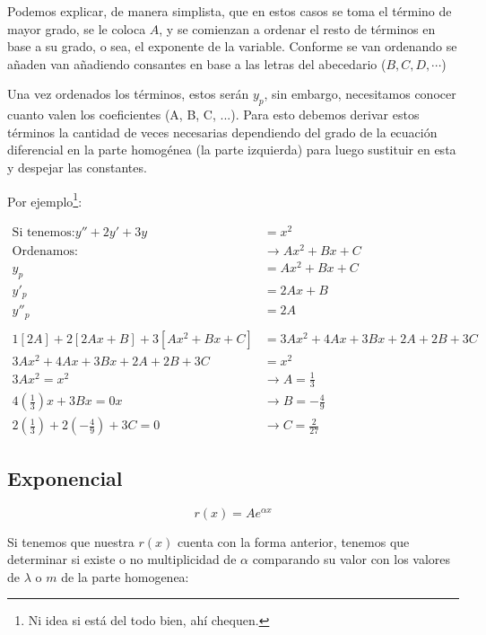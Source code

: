 Podemos explicar, de manera simplista, que en estos casos se toma el término de mayor grado, se le coloca $A$, y se comienzan a ordenar el resto de términos en base a su grado, o sea, el exponente de la variable. Conforme se van ordenando se añaden van añadiendo consantes en base a las letras del abecedario ($B,C,D, \cdots$)

Una vez ordenados los términos, estos serán $y_{p}$, sin embargo, necesitamos conocer cuanto valen los coeficientes (A, B, C, ...). Para esto debemos derivar estos términos la cantidad de veces necesarias dependiendo del grado de la ecuación diferencial en la parte homogénea (la parte izquierda) para luego sustituir en esta y despejar las constantes.

Por ejemplo\footnote{Ni idea si está del todo bien, ahí chequen.}:

\begin{align*}
    \text{Si tenemos:} y'' + 2y' + 3y &= x^{2}
    \\
    \text{Ordenamos:} &\longrightarrow Ax^{2} + Bx + C
    \\
    y_{p} &= Ax^{2} + Bx + C
    \\
    y'_{p} &= 2Ax + B
    \\
    y''_{p} &= 2A
    \\
    \\
    1[2A] + 2[2Ax + B] + 3[Ax^{2} + Bx + C] &= 3Ax^{2} + 4Ax + 3Bx + 2A + 2B + 3C
    \\
    3Ax^{2} + 4Ax + 3Bx + 2A + 2B + 3C &= x^{2}
    \\
    3Ax^{2} = x^{2} &\longrightarrow A = \frac{1}{3}
    \\
    4(\frac{1}{3})x + 3Bx = 0x &\longrightarrow B = -\frac{4}{9} 
    \\
    2(\frac{1}{3}) + 2(-\frac{4}{9}) + 3C = 0 &\longrightarrow C = \frac{2}{27} 
\end{align*}

\subsection{Exponencial}

\begin{equation}\label{eq:eq_exponencial}
    r(x) = Ae^{\alpha x}
\end{equation}

Si tenemos que nuestra $r(x)$ cuenta con la forma anterior, tenemos que determinar si existe o no multiplicidad de $\alpha$ comparando su valor con los valores de $\lambda$ o $m$ de la parte homogenea:

